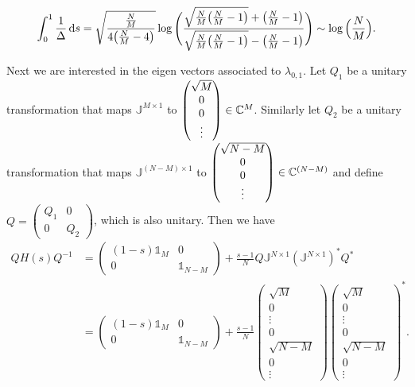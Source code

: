 \begin{lemma}
\[ \int_0^1 \frac{1}{\Delta}\operatorname{d \!}{s} = \sqrt{\frac{\frac{N}{M}}{4\big(\frac{N}{M}-4\big)}}\log\Bigg(\frac{\sqrt{\frac{N}{M}\big(\frac{N}{M}-1\big)}+ \big(\frac{N}{M}-1\big)}{\sqrt{\frac{N}{M}\big(\frac{N}{M}-1\big)}- \big(\frac{N}{M}-1\big)}\Bigg) \sim \log\Big(\frac{N}{M}\Big). \]
\end{lemma}

Next we are interested in the eigen vectors associated to $\lambda_{0,1}$. Let $Q_1$ be a unitary transformation that maps $\mathbb{J}^{M\times 1}$ to $\begin{pmatrix}
\sqrt{M} \\ 0 \\ 0 \\ \vdots
\end{pmatrix} \in \mathbb{C}^M$. Similarly let $Q_2$ be a unitary transformation that maps $\mathbb{J}^{(N-M)\times 1}$ to $\begin{pmatrix}
\sqrt{N-M} \\ 0 \\ 0 \\ \vdots
\end{pmatrix} \in \mathbb{C}^{(N-M)}$ and define $Q = \begin{pmatrix}
Q_1 & 0 \\ 0 & Q_2
\end{pmatrix}$, which is also unitary. Then we have
\begin{align*}
    QH(s)Q^{-1} &= \begin{pmatrix}
        (1-s)\mathbb{1}_M & 0 \\ 0 & \mathbb{1}_{N-M}
        \end{pmatrix} + \frac{s-1}{N}Q\mathbb{J}^{N\times 1}(\mathbb{J}^{N\times 1})^*Q^* \\
    &= \begin{pmatrix}
        (1-s)\mathbb{1}_M & 0 \\ 0 & \mathbb{1}_{N-M}
        \end{pmatrix} + \frac{s-1}{N} \begin{pmatrix}\sqrt{M} \\ 0 \\ \vdots \\ 0 \\ \sqrt{N-M} \\ 0 \\ \vdots \end{pmatrix}\begin{pmatrix}\sqrt{M} \\ 0 \\ \vdots \\ 0 \\ \sqrt{N-M} \\ 0 \\ \vdots \end{pmatrix}^*.
\end{align*}

